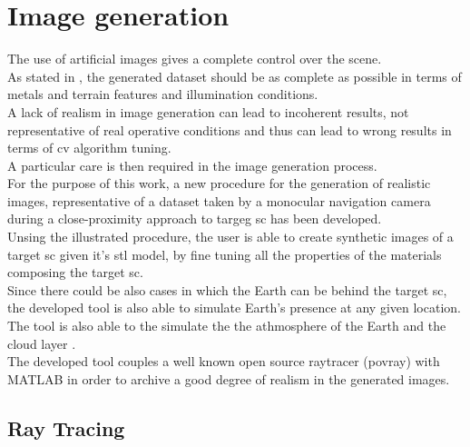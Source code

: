 \section{Image generation}
The use of artificial images gives a complete control over the scene.\\
As stated in \cite{paolocorti}, the generated dataset should be as complete as possible in terms of metals and terrain features and illumination conditions.\\
A lack of realism in image generation can lead to incoherent results, not representative of real operative conditions and thus can lead to wrong results in terms of \acrshort{cv} algorithm tuning.\\
A particular care is then required in the image generation process.\\
For the purpose of this work, a new procedure for the generation of realistic images, representative of a dataset taken by a monocular navigation camera during a close-proximity approach to targeg \acrshort{sc} has been developed.\\
Unsing the illustrated procedure, the user is able to create synthetic images of a target \acrshort{sc} given it's \acrshort{stl} model, by fine tuning all the properties of the materials composing the target \acrshort{sc}.\\
Since there could be also cases in which the Earth can be behind the target \acrshort{sc}, the developed tool is also able to simulate Earth's presence at any given location. The tool is also able to the simulate the the athmosphere of the Earth and the cloud layer \cite{jacopo}.\\
The developed tool couples a well known open source raytracer (\acrshort{povray}) with MATLAB in order to archive a good degree of realism in the generated images.\\

\subsection{Ray Tracing}
